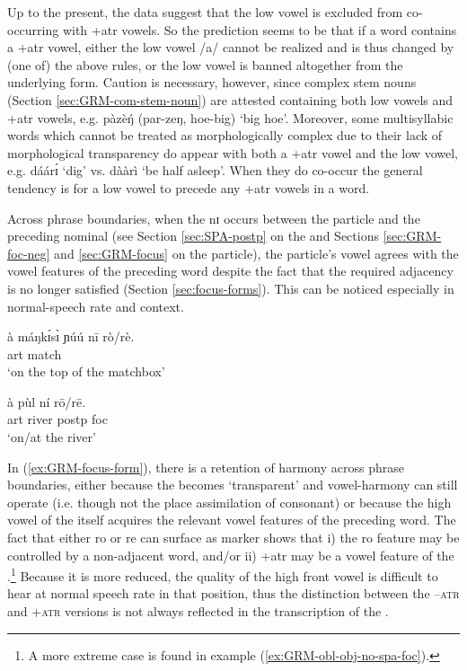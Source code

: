 Up to the present, the data suggest that the low vowel is excluded from 
co-occurring with {\sc +atr}  vowels.  So the prediction seems to be that if a 
word contains a {\sc +atr} vowel,  either the low vowel {/{a}/} cannot be 
realized and is thus changed by (one of) the above rules, or  the  low vowel is 
banned  altogether from the underlying form. Caution is necessary, however, since complex stem nouns (Section \ref{sec:GRM-com-stem-noun}) are attested containing both  low vowels and {\sc +atr} vowels, e.g. {\sls pàzèŋ́} ({\sls par-zeŋ}, {\sc hoe-big})  `big hoe'. Moreover, some multisyllabic words which cannot be treated as morphologically complex  due to their lack of morphological transparency do appear with both  a {\sc +atr} vowel and  the low vowel, e.g. {\sls dáárɪ́} `dig' vs.  {\sls dààrì}  `be half asleep'. When they do co-occur the general tendency is for a low 
vowel to precede any {\sc +atr} vowels in a word. 



Across phrase boundaries, when the   {\sls nɪ}  occurs between the  particle and the preceding nominal (see Section \ref{sec:SPA-postp} on the  and Sections \ref{sec:GRM-foc-neg} and 
\ref{sec:GRM-focus} on the  particle),  the  particle's
vowel agrees with the vowel features of  the  preceding word despite the fact that the 
required adjacency is no longer satisfied (Section  \ref{sec:focus-forms}). This can be noticed  
especially in normal-speech rate and context.


\ea\label{ex:GRM-focus-form}

 
\ea\label{ex:GRM-foc-form-1}
\gll  à máŋkɪ́sɪ̀ ɲúú nī rò/rè.\\
    {\sc art} {match} {\reln} {\postp} {\foc}\\
\glt `on the top of the matchbox'

\ex\label{ex:GRM-foc-form-2}
\gll  à  pùl  ní rō/rē.\\
    {\sc art} {river} {\sc postp}  {\sc foc}\\
\glt `on/at the river'

\z 
 \z

In (\ref{ex:GRM-focus-form}), there is a retention of harmony across phrase boundaries, either because the  becomes `transparent' and vowel-harmony can still operate (i.e. though not the place assimilation of  consonant) or because the high vowel of the  itself acquires the relevant  vowel features of  the  preceding word. The fact that either {\sls ro} or {\sls re} can surface as  marker shows 
that i) the  {\sc ro} feature may be controlled by a non-adjacent word, and/or ii)   {\sc +atr} may be a vowel feature of the .\footnote{A more extreme case is found in example (\ref{ex:GRM-obl-obj-no-spa-foc}).}  Because it is more reduced, the quality of the high front vowel is difficult to hear at normal speech rate in that position, thus the distinction between the  \textsc{--atr} and   \textsc{+atr} versions is not always reflected in the 
transcription of the .





